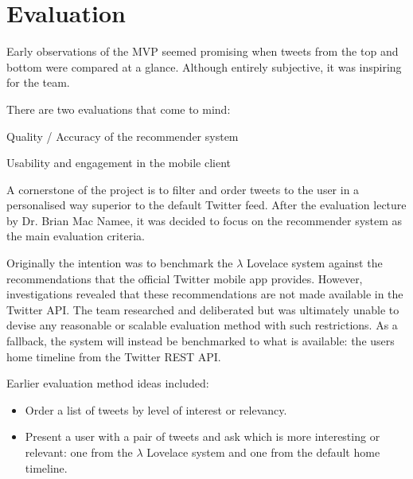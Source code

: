 \documentclass{article}
\begin{document}
\newpage


\section{Evaluation}

Early observations of the MVP seemed promising when tweets from the top and bottom were compared at a glance. Although entirely subjective, it was inspiring for the team.
\\

\begin{samepage}
\noindent There are two evaluations that come to mind:

\begin{itemize*}
	\item Quality / Accuracy of the recommender system
	\item Usability and engagement in the mobile client
\end{itemize*}
\end{samepage}

\noindent A cornerstone of the project is to filter and order tweets to the user in a personalised way superior to the default Twitter feed. After the evaluation lecture by Dr. Brian Mac Namee, it was decided to focus on the recommender system as the main evaluation criteria.

Originally the intention was to benchmark the $\lambda$ Lovelace system against the recommendations that the official Twitter mobile app provides. However, investigations revealed that these recommendations are not made available in the Twitter API. The team researched and deliberated but was ultimately unable to devise any reasonable or scalable evaluation method with such restrictions. As a fallback, the system will instead be benchmarked to what is available: the users home timeline from the Twitter REST API.
\\

\begin{samepage}
\noindent Earlier evaluation method ideas included: 

\begin{itemize}
    \item Order a list of tweets by level of interest or relevancy.
    \item Present a user with a pair of tweets and ask which is more interesting or relevant: one from the $\lambda$ Lovelace system and one from the default home timeline.
\end{itemize}
\end{samepage}
\end{document}
